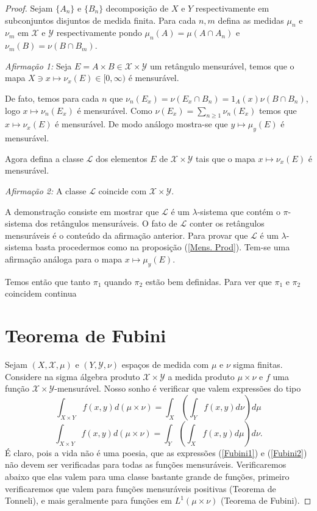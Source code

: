 \begin{proof}
Sejam $\{A_n\}$ e $\{B_n\}$ decomposição de $X$ e $Y$ respectivamente em subconjuntos 
disjuntos de medida finita. Para cada $n,m$ defina as medidas $\mu_n$ e $\nu_m$ 
em  $\mathscr{X}$ e $ \mathscr{Y}$ respectivamente  pondo  $\mu_n(A)=\mu(A\cap A_n)$ e 
$\nu_m(B)=\nu(B\cap B_m)$. 
\medskip

\noindent \emph{Afirmação 1:} Seja $E=A\times B\in \mathscr{X}\times \mathscr{Y}$ um retângulo mensurável, temos que o mapa 
$X\ni x\mapsto \nu_x(E)\in [0, \infty)$ é mensurável.
\medskip


 De fato, temos para cada $n$ que  $\nu_n(E_x)=\nu(E_x\cap B_n)=1_A(x)  \nu(B\cap B_n)$, logo 
 $x\mapsto \nu_n(E_x)$ é mensurável. Como $\nu(E_x)=\sum_{n\geq 1}\nu_n(E_x)$ temos que 
 $x\mapsto \nu_x(E)$ é mensurável. De modo análogo mostra-se que $y\mapsto \mu_y(E)$ é mensurável.

Agora defina a classe $\mathscr{L}$ dos elementos $E$ de $\mathscr{X}\times \mathscr{Y}$ tais que 
o mapa $x\mapsto \nu_x(E)$ é mensurável.

\noindent \emph{Afirmação 2:} A classe $\mathscr{L}$ coincide com $\mathscr{X}\times \mathscr{Y}$.
\medskip

A demonstração consiste em mostrar que $\mathscr{L}$ é um $\lambda$-sistema que contém o $\pi$-sistema dos 
retângulos mensuráveis.
 O fato de $\mathscr{L}$ conter os retângulos 
 mensuráveis é o conteúdo da afirmação anterior.
 Para provar que $\mathscr{L}$ é um $\lambda$-sistema basta procedermos como na proposição (\ref{Mens. Prod}).
  Tem-se uma afirmação análoga para o mapa $x\mapsto \mu_y(E)$. 
  
  Temos então que tanto $\pi_1$ quando $\pi_2$ estão bem definidas. Para ver que $\pi_1$ e $\pi_2$ coincidem 
{\red continua}

\section{Teorema de Fubini}  
 Sejam $(X, \mathscr{X}, \mu)$ e $(Y, \mathscr{Y}, \nu)$
 espaços de medida com $\mu$ e $\nu$ sigma finitas. Considere na sigma álgebra
 produto $\mathscr{X}\times \mathscr{Y}$ a medida produto $\mu\times \nu$ e $f$ uma função $\mathscr{X}\times \mathscr{Y}$-mensurável. Nosso sonho 
 é verificar que valem expressões do tipo 
 \begin{equation}\label{Fubini1}
 \int_{X\times Y}f(x,y) d(\mu\times\nu)= \int_X(\int_Yf(x,y) d\nu)d\mu
 \end{equation}
 \begin{equation}\label{Fubini2}
 \int_{X\times Y}f(x,y) d(\mu\times \nu)=\int_Y(\int_Xf(x,y) d\mu)d\nu.
 \end{equation}
É claro, pois a vida não é uma poesia, que as expressões (\ref{Fubini1}) e (\ref{Fubini2}) não devem ser
verificadas para todas as funções mensuráveis. Verificaremos abaixo que elas valem para uma classe bastante 
grande de funções, primeiro verificaremos que valem para funções mensuráveis positivas (Teorema de Tonneli),
e mais geralmente para funções em $L^1(\mu\times \nu)$ (Teorema de Fubini).
\end{proof}



